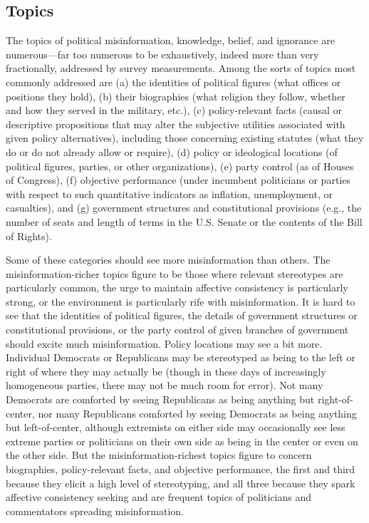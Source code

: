 \documentclass[11pt]{article}
\begin{document}
\subsection{Topics}

The topics of political misinformation, knowledge, belief, and ignorance are numerous---far too numerous to be exhaustively, indeed more than very fractionally, addressed by survey measurements. Among the sorts of topics most commonly addressed are (a) the identities of political figures (what offices or positions they hold), (b) their biographies (what religion they follow, whether and how they served in the military, etc.), (c) policy-relevant facts (causal or descriptive propositions that may alter the subjective utilities associated with given policy alternatives), including those concerning existing statutes (what they do or do not already allow or require), (d) policy or ideological locations (of political figures, parties, or other organizations), (e) party control (as of Houses of Congress), (f) objective performance (under incumbent politicians or parties with respect to such quantitative indicators as inflation, unemployment, or casualties), and (g) government structures and constitutional provisions (e.g., the number of seats and length of terms in the U.S. Senate or the contents of the Bill of Rights).

Some of these categories should see more misinformation than others. The misinformation-richer topics figure to be those where relevant stereotypes are particularly common, the urge to maintain affective consistency is particularly strong, or the environment is particularly rife with misinformation. It is hard to see that the identities of political figures, the details of government structures or constitutional provisions, or the party control of given branches of government should excite much misinformation. Policy locations may see a bit more. Individual Democrats or Republicans may be stereotyped as being to the left or right of where they may actually be (though in these days of increasingly homogeneous parties, there may not be much room for error). Not many Democrats are comforted by seeing Republicans as being anything but right-of-center, nor many Republicans comforted by seeing Democrats as being anything but left-of-center, although extremists on either side may occasionally see less extreme parties or politicians on their own side as being in the center or even on the other side. But the misinformation-richest topics figure to concern biographies, policy-relevant facts, and objective performance, the first and third because they elicit a high level of stereotyping, and all three because they spark affective consistency seeking and are frequent topics of politicians and commentators spreading misinformation.
\end{document}
